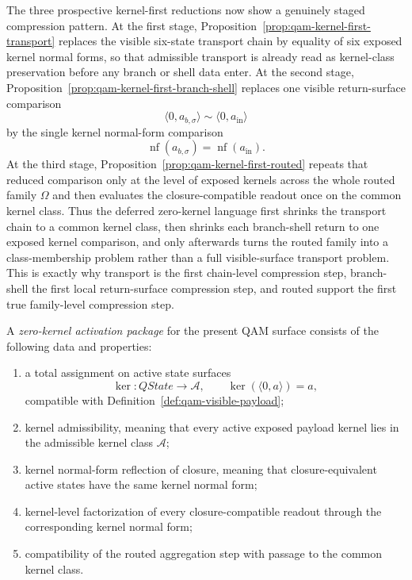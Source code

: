\begin{remark}\label{rem:qam-staged-kernel-compression}
The three prospective kernel-first reductions now show a genuinely staged compression pattern.
At the first stage, Proposition~\ref{prop:qam-kernel-first-transport} replaces the visible six-state transport chain by equality of six exposed kernel normal forms, so that admissible transport is already read as kernel-class preservation before any branch or shell data enter.
At the second stage, Proposition~\ref{prop:qam-kernel-first-branch-shell} replaces one visible return-surface comparison
\[
\langle 0,a_{b,\sigma}\rangle \sim \langle 0,a_{\mathrm{in}}\rangle
\]
by the single kernel normal-form comparison
\[
\operatorname{nf}(a_{b,\sigma})=\operatorname{nf}(a_{\mathrm{in}}).
\]
At the third stage, Proposition~\ref{prop:qam-kernel-first-routed} repeats that reduced comparison only at the level of exposed kernels across the whole routed family $\Omega$ and then evaluates the closure-compatible readout once on the common kernel class. Thus the deferred zero-kernel language first shrinks the transport chain to a common kernel class, then shrinks each branch-shell return to one exposed kernel comparison, and only afterwards turns the routed family into a class-membership problem rather than a full visible-surface transport problem. This is exactly why transport is the first chain-level compression step, branch-shell the first local return-surface compression step, and routed support the first true family-level compression step.
\end{remark}

\begin{definition}\label{def:qam-zero-kernel-activation-package}
A \emph{zero-kernel activation package} for the present QAM surface consists of the following data and properties:
\begin{enumerate}[label=(\roman*)]
\item a total assignment on active state surfaces
\[
\ker:QState \to \mathcal A, \qquad \ker(\langle 0,a\rangle)=a,
\]
compatible with Definition~\ref{def:qam-visible-payload};
\item kernel admissibility, meaning that every active exposed payload kernel lies in the admissible kernel class \(\mathcal A\);
\item kernel normal-form reflection of closure, meaning that closure-equivalent active states have the same kernel normal form;
\item kernel-level factorization of every closure-compatible readout through the corresponding kernel normal form;
\item compatibility of the routed aggregation step with passage to the common kernel class.
\end{enumerate}
\end{definition}

